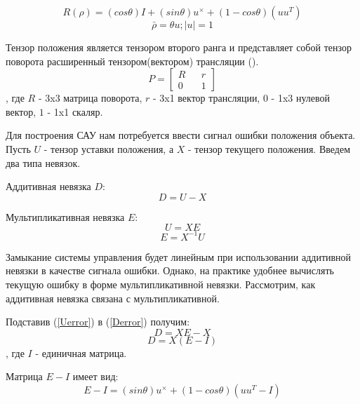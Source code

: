 \documentclass[a4paper]{article}
\begin{document}
\begin{equation}
R(\rho) = (cos \theta) I + (sin \theta)u^{\times} + (1-cos \theta)(uu^T)
\end{equation}
\begin{equation} \bar{\rho} = \theta u; |u| = 1 \end{equation}

Тензор положения является тензором второго ранга и представляет собой тензор поворота расширенный тензором(вектором) трансляции (\cite{complex}).
\begin{equation}
P = \begin{bmatrix}R&&r\\0&&1\end{bmatrix}
\end{equation}
, где $R$ - 3x3 матрица поворота, $r$ - 3x1 вектор трансляции, $0$ - 1x3 нулевой вектор, $1$ - 1x1 скаляр.  

Для построения САУ нам потребуется ввести сигнал ошибки положения объекта. 
Пусть $U$ - тензор уставки положения, а $X$ - тензор текущего положения.
Введем два типа невязок.

Аддитивная невязка $D$:
\begin{equation} \label{Derror}
D = U - X
\end{equation}

Мультипликативная невязка $E$:
\begin{equation} \label{Uerror} U = XE 		\end{equation}
\begin{equation} \label{Eerror} E = X^{-1}U 	\end{equation}

Замыкание системы управления будет линейным при использовании аддитивной невязки в качестве сигнала ошибки. Однако, на практике удобнее вычислять текущую ошибку в форме мультипликативной невязки. Рассмотрим, как аддитивная невязка связана с мультипликативной. 

Подставив (\ref{Uerror}) в (\ref{Derror}) получим:
\begin{equation} D = XE - X 	\end{equation}
\begin{equation} D = X(E - I)	\end{equation}
, где $I$ - единичная матрица.

Матрица $E - I$ имеет вид:
\begin{equation} E - I = (sin \theta)u^{\times} + (1 - cos \theta)(uu^T - I) \end{equation}
\end{document}
